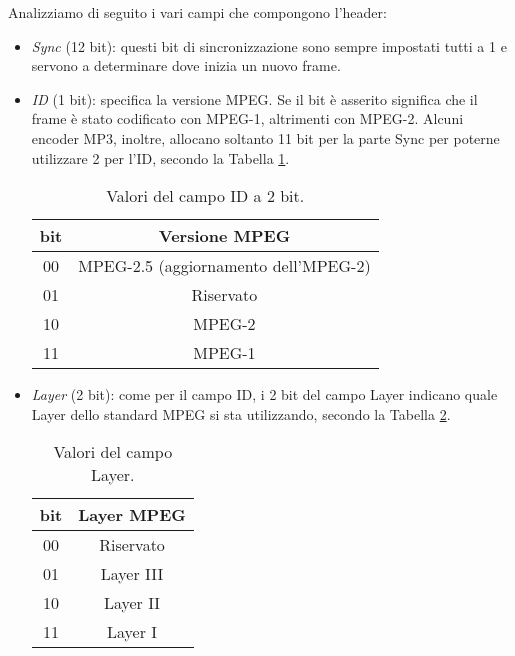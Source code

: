 		Analizziamo di seguito i vari campi che compongono l'header:
		\begin{itemize}
			\item \textit{Sync} (12 bit): questi bit di sincronizzazione sono sempre impostati tutti a 1 e servono a determinare dove inizia un nuovo frame.
			
			\item \textit{ID} (1 bit): specifica la versione MPEG. Se il bit è asserito significa che il frame è stato codificato con MPEG-1, altrimenti con MPEG-2. Alcuni encoder MP3, inoltre, allocano soltanto 11 bit per la parte Sync per poterne utilizzare 2 per l'ID, secondo la Tabella \ref{tab:campo_id}.
			
				\begin{table}[h!]
					\centering
					\begin{tabular}{|c|c|}
						\multicolumn{1}{c}{\textbf{bit}} & \multicolumn{1}{c}{\textbf{Versione MPEG}}\\
						\hline
						00 & MPEG-2.5 (aggiornamento dell'MPEG-2)\\
						\hline
						01 & Riservato\\
						\hline
						10 & MPEG-2\\
						\hline
						11 & MPEG-1\\
						\hline
					\end{tabular}
					\caption{Valori del campo ID a 2 bit.}
					\label{tab:campo_id}
				\end{table}
				
			\item \textit{Layer} (2 bit): come per il campo ID, i 2 bit del campo Layer indicano quale Layer dello standard MPEG si sta utilizzando, secondo la Tabella \ref{tab:campo_layer}.
			
				\begin{table}[h!]
					\centering
					\begin{tabular}{|c|c|}
						\multicolumn{1}{c}{\textbf{bit}} & \multicolumn{1}{c}{\textbf{Layer MPEG}}\\
						\hline
						00 & Riservato\\
						\hline
						01 & Layer III\\
						\hline
						10 & Layer II\\
						\hline
						11 & Layer I\\
						\hline
					\end{tabular}
					\caption{Valori del campo Layer.}
					\label{tab:campo_layer}
				\end{table}
			

\end{itemize}

